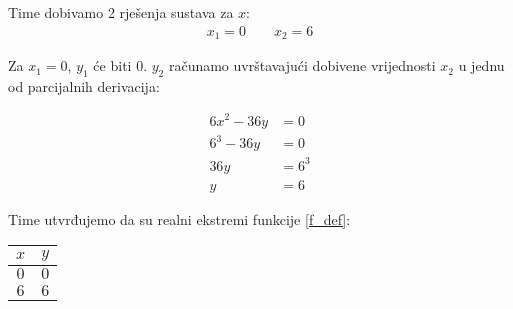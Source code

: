 Time dobivamo 2 rješenja sustava za $x$:
\begin{gather*}
    x_1 = 0 \qquad x_2 = 6
\end{gather*}

Za $x_1 = 0$, $y_1$ će biti $0$. $y_2$ računamo uvrštavajući dobivene vrijednosti $x_2$ u jednu od parcijalnih derivacija:

\begin{align*}
    6x^2 - 36y &= 0\\
    6^3 - 36y &= 0\\
    36y &= 6^3\\
    y &= 6
\end{align*}

Time utvrđujemo da su realni ekstremi funkcije \eqref{f_def}:

\begin{center}
\begin{tabular}{c | c}
    $x$ & $y$ \\
    \hline
    $0$ & $0$ \\
    $6$ & $6$ \\
\end{tabular}
\end{center}

\newpage